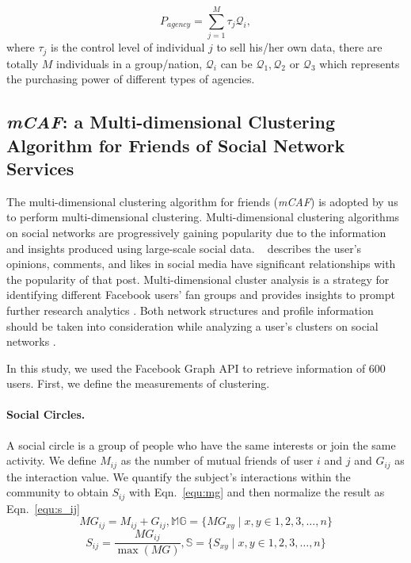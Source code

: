 \documentclass{mcmthesis}
\begin{document}
\begin{equation}\label{equ:agency}
P_{agency}=\sum_{j=1}^{M}\tau_j\mathcal{Q}_i,
\end{equation}
where $\tau_j$ is the control level of individual $j$ to sell his/her own data, there are totally $M$ individuals in a group/nation, $\mathcal{Q}_i$ can be $\mathcal{Q}_1, \mathcal{Q}_2$ or $\mathcal{Q}_3$ which represents the purchasing power of different types of agencies.
\subsection{\emph{mCAF}: a Multi-dimensional Clustering Algorithm for Friends of Social Network Services}
The multi-dimensional clustering algorithm for friends (\emph{mCAF}) is adopted by us to perform multi-dimensional clustering. Multi-dimensional clustering algorithms on social networks are progressively gaining popularity due to the information and insights produced using large-scale social data. ~\cite{khobzi2014significant} describes the user's opinions, comments, and likes in social media have significant relationships with the popularity of that post. Multi-dimensional cluster analysis is a strategy for identifying different Facebook users' fan groups and provides insights to prompt further research analytics \cite{wallace2014likes}. Both network structures and profile information should be taken into consideration while analyzing a user's clusters on social networks \cite{gross2005information,mcauley2014discovering}. 

In this study, we used the Facebook Graph API to retrieve information of 600 users. First, we define the measurements of clustering.

\paragraph{Social Circles.} A social circle is a group of people who have the same interests or join the same activity. We define $M_{ij}$ as the number of mutual friends of user $i$ and $j$ and $G_{ij}$ as the interaction value. We quantify the subject's interactions within the community to obtain $S_{ij}$ with Eqn.~\eqref{equ:mg} and then normalize the result as Eqn.~\eqref{equ:s_ij}
\begin{equation}\label{equ:mg}
MG_{ij}=M_{ij}+G_{ij}, \mathbb{MG}=\{MG_{xy}\mid x, y\in1,2,3,\dots,n\}
\end{equation}
\begin{equation}\label{equ:s_ij}
S_{ij}=\frac{MG_{ij}}{\max(MG)}, \mathbb{S}=\{S_{xy}\mid x,y\in 1,2,3,\dots, n\}
\end{equation}
\end{document}
